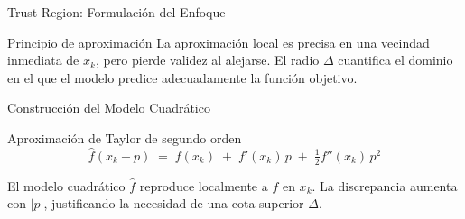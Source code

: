 \begin{frame}{Trust Region: Formulación del Enfoque}
    \vspace{0.6em}
    \footnotesize
    \begin{block}{Principio de aproximación}
        \scriptsize
        La aproximación local es precisa en una vecindad inmediata de \(x_k\), pero pierde validez al alejarse. El radio \(\Delta\) cuantifica el dominio en el que el modelo predice adecuadamente la función objetivo.
    \end{block}
\end{frame}

\begin{frame}{Construcción del Modelo Cuadrático}
    \begin{block}{Aproximación de Taylor de segundo orden}
        \small
        \[
            \hat f(x_k + p) \;=\;
            f(x_k) \;+\;
            f'(x_k)\,p \;+\;
            \tfrac{1}{2}f''(x_k)\,p^{2}
        \]
    \end{block}

    \vspace{-0.2em}
    \begin{center}
    \end{center}

    \vspace{-0.3em}
    \scriptsize
    El modelo cuadrático \(\hat f\) reproduce localmente a \(f\) en \(x_k\). La discrepancia aumenta con \(|p|\), justificando la necesidad de una cota superior \(\Delta\).
\end{frame}

